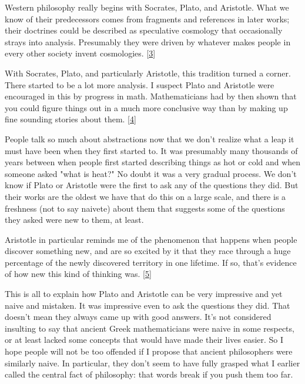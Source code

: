 Western philosophy really begins with Socrates,
                  Plato, and Aristotle. What we know of their predecessors comes
                  from fragments and references in later works; their doctrines
                  could be described as speculative cosmology that occasionally
                  strays into analysis. Presumably they were driven by whatever
                  makes people in every other society invent cosmologies.
                  [\href{\#f3n}{3}]

With Socrates, Plato, and particularly Aristotle,
                  this tradition turned a corner. There started to be a lot more
                  analysis. I suspect Plato and Aristotle were encouraged in
                  this by progress in math. Mathematicians had by then shown
                  that you could figure things out in a much more conclusive way
                  than by making up fine sounding stories about them.
                  [\href{\#f4n}{4}]

People talk so much about abstractions now that
                  we don't realize what a leap it must have been when they first
                  started to. It was presumably many thousands of years between
                  when people first started describing things as hot or cold and
                  when someone asked "what is heat?" No doubt it was a very
                  gradual process. We don't know if Plato or Aristotle were the
                  first to ask any of the questions they did. But their works
                  are the oldest we have that do this on a large scale, and
                  there is a freshness (not to say naivete) about them that
                  suggests some of the questions they asked were new to them, at
                  least.

Aristotle in particular reminds me of the
                  phenomenon that happens when people discover something new,
                  and are so excited by it that they race through a huge
                  percentage of the newly discovered territory in one lifetime.
                  If so, that's evidence of how new this kind of thinking was.
                  [\href{\#f5n}{5}]

This is all to explain how Plato and Aristotle
                  can be very impressive and yet naive and mistaken. It was
                  impressive even to ask the questions they did. That doesn't
                  mean they always came up with good answers. It's not
                  considered insulting to say that ancient Greek mathematicians
                  were naive in some respects, or at least lacked some concepts
                  that would have made their lives easier. So I hope people will
                  not be too offended if I propose that ancient philosophers
                  were similarly naive. In particular, they don't seem to have
                  fully grasped what I earlier called the central fact of
                  philosophy: that words break if you push them too far.

